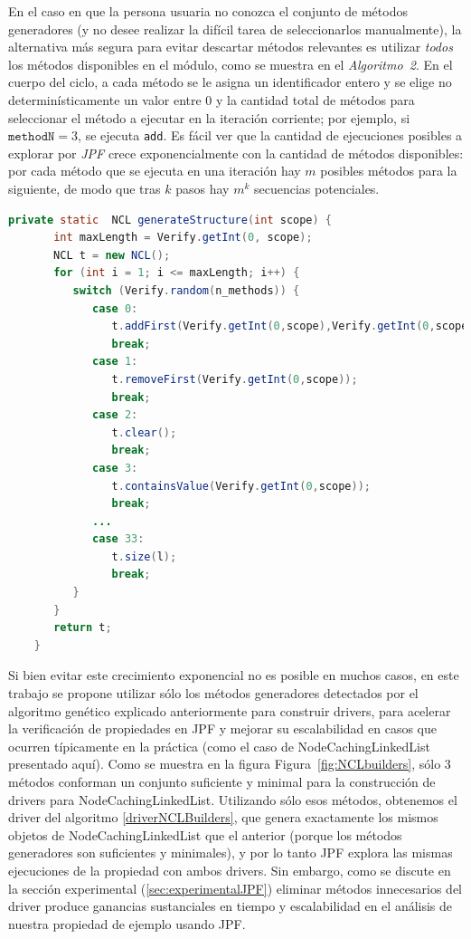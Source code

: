 En el caso en que la persona usuaria no conozca el conjunto de
métodos generadores (y no desee realizar la difícil tarea de seleccionarlos
manualmente), la alternativa más segura para evitar descartar métodos
relevantes es utilizar \emph{todos} los métodos disponibles en el módulo,
como se muestra en el \textit{Algoritmo~2}. En el cuerpo del ciclo, a cada
método se le asigna un identificador entero y se elige no determinísticamente
un valor entre \(0\) y la cantidad total de métodos para seleccionar el
método a ejecutar en la iteración corriente; por ejemplo, si
\(\texttt{methodN}=3\), se ejecuta \texttt{add}. Es fácil ver que la cantidad
de ejecuciones posibles a explorar por \emph{JPF} crece exponencialmente con
la cantidad de métodos disponibles: por cada método que se ejecuta en una
iteración hay \(m\) posibles métodos para la siguiente, de modo que tras
\(k\) pasos hay \(m^{k}\) secuencias potenciales.

\begin{lstlisting}[language=Java,caption={Controlador con todos los métodos},label={lst:driverNCL},captionpos=b]
    private static  NCL generateStructure(int scope) {
       int maxLength = Verify.getInt(0, scope);
       NCL t = new NCL();
       for (int i = 1; i <= maxLength; i++) {
          switch (Verify.random(n_methods)) {
             case 0:
                t.addFirst(Verify.getInt(0,scope),Verify.getInt(0,scope));
                break;
             case 1:
                t.removeFirst(Verify.getInt(0,scope));
                break;						
             case 2:
                t.clear();
                break;
             case 3:
                t.containsValue(Verify.getInt(0,scope));
                break;
             ...
             case 33: 
                t.size(l);
                break;
          }
       }
       return t;
    }
\end{lstlisting}

Si bien evitar este crecimiento exponencial no es posible en muchos casos, en este trabajo se propone utilizar sólo los métodos generadores detectados por el algoritmo
genético explicado anteriormente para construir drivers, para acelerar la verificación de propiedades en JPF y mejorar su escalabilidad en casos que ocurren
típicamente en la práctica (como el caso de NodeCachingLinkedList presentado aquí). Como se muestra en la figura Figura~\ref{fig:NCLbuilders}, sólo 3 métodos conforman un conjunto
suficiente y minimal para la construcción de drivers para NodeCachingLinkedList. Utilizando sólo esos métodos, obtenemos el driver del algoritmo \ref{driverNCLBuilders}, que
genera exactamente los mismos objetos de NodeCachingLinkedList que el anterior (porque los métodos generadores son suficientes y minimales), y por lo tanto JPF explora
las mismas ejecuciones de la propiedad con ambos drivers. Sin embargo, como
se discute en la sección experimental (\ref{sec:experimentalJPF}) eliminar métodos innecesarios del driver produce ganancias sustanciales en tiempo y escalabilidad en el análisis de nuestra
propiedad de ejemplo usando JPF.

